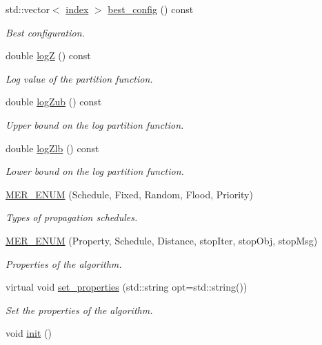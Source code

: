 \begin{DoxyCompactItemize}
std\+::vector$<$ \hyperlink{classmerlin_1_1graph_a5cade38832f47248573e921276f122d6}{index} $>$ \hyperlink{classmerlin_1_1lbp_a7511d2d8fe99649f85a5c8ae88a8a379}{best\+\_\+config} () const 
\begin{DoxyCompactList}\small\item\em Best configuration. \end{DoxyCompactList}\item 
double \hyperlink{classmerlin_1_1lbp_a5f0f0d6b2605e1b3f47b6de9875d5590}{log\+Z} () const 
\begin{DoxyCompactList}\small\item\em Log value of the partition function. \end{DoxyCompactList}\item 
double \hyperlink{classmerlin_1_1lbp_a0451118b6fa2c1017512879e025afd4d}{log\+Zub} () const 
\begin{DoxyCompactList}\small\item\em Upper bound on the log partition function. \end{DoxyCompactList}\item 
double \hyperlink{classmerlin_1_1lbp_ada4dd7a71b8ac11ad419f3f7b1b6d658}{log\+Zlb} () const 
\begin{DoxyCompactList}\small\item\em Lower bound on the log partition function. \end{DoxyCompactList}\item 
\hypertarget{classmerlin_1_1lbp_ab4dc295e5265a3a2e259dc979ba35b91}{}\hyperlink{classmerlin_1_1lbp_ab4dc295e5265a3a2e259dc979ba35b91}{M\+E\+R\+\_\+\+E\+N\+U\+M} (Schedule, Fixed, Random, Flood, Priority)\label{classmerlin_1_1lbp_ab4dc295e5265a3a2e259dc979ba35b91}

\begin{DoxyCompactList}\small\item\em Types of propagation schedules. \end{DoxyCompactList}\item 
\hypertarget{classmerlin_1_1lbp_aeafc48bb120a46ebe1f7a3588d9a0b8f}{}\hyperlink{classmerlin_1_1lbp_aeafc48bb120a46ebe1f7a3588d9a0b8f}{M\+E\+R\+\_\+\+E\+N\+U\+M} (Property, Schedule, Distance, stop\+Iter, stop\+Obj, stop\+Msg)\label{classmerlin_1_1lbp_aeafc48bb120a46ebe1f7a3588d9a0b8f}

\begin{DoxyCompactList}\small\item\em Properties of the algorithm. \end{DoxyCompactList}\item 
virtual void \hyperlink{classmerlin_1_1lbp_a2feb90924b5d7bf82a40bf93912041d0}{set\+\_\+properties} (std\+::string opt=std\+::string())
\begin{DoxyCompactList}\small\item\em Set the properties of the algorithm. \end{DoxyCompactList}\item 
\hypertarget{classmerlin_1_1lbp_a61e6c00e8236acc65b59194e09180692}{}void \hyperlink{classmerlin_1_1lbp_a61e6c00e8236acc65b59194e09180692}{init} ()\label{classmerlin_1_1lbp_a61e6c00e8236acc65b59194e09180692}


\end{DoxyCompactItemize}
